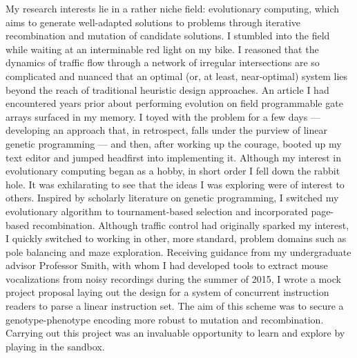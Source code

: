 \documentclass[12pt]{book}
\begin{document}

My research interests lie in a rather niche field: evolutionary computing, which aims to generate well-adapted solutions to problems through iterative recombination and mutation of candidate solutions.
I stumbled into the field while waiting at an interminable red light on my bike.
I reasoned that the dynamics of traffic flow through a network of irregular intersections are so complicated and nuanced that an optimal (or, at least, near-optimal) system lies beyond the reach of traditional heuristic design approaches.
An article I had encountered years prior about performing evolution on field programmable gate arrays surfaced in my memory.
I toyed with the problem for a few days --- developing an approach that, in retrospect, falls under the purview of linear genetic programming --- and then, after working up the courage, booted up my text editor and jumped headfirst into implementing it.
Although my interest in evolutionary computing began as a hobby, in short order I fell down the rabbit hole.
It was exhilarating to see that the ideas I was exploring were of interest to others.
Inspired by scholarly literature on genetic programming, I switched my evolutionary algorithm to tournament-based selection and incorporated page-based recombination.
Although traffic control had originally sparked my interest, I quickly switched to working in other, more standard, problem domains such as pole balancing and maze exploration.
Receiving guidance from my undergraduate advisor Professor Smith, with whom I had developed tools to extract mouse vocalizations from noisy recordings during the summer of 2015, I wrote a mock project proposal laying out the design for a system of concurrent instruction readers to parse a linear instruction set.
The aim of this scheme was to secure a genotype-phenotype encoding more robust to mutation and recombination.
Carrying out this project was an invaluable opportunity to learn and explore by playing in the sandbox.
\end{document}
